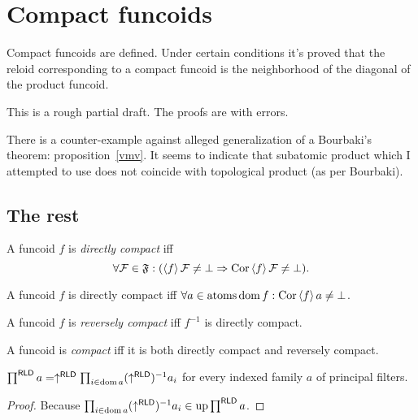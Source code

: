 \chapter{Compact funcoids}

Compact funcoids are defined. Under certain conditions it's proved that the
reloid corresponding to a compact funcoid is the neighborhood of the diagonal
of the product funcoid.

This is a rough partial draft. The proofs are with errors.

There is a counter-example against alleged generalization of a Bourbaki's theorem:
proposition~\ref{vmv}. It seems to indicate that subatomic product which I attempted to use
does not coincide with topological product (as per Bourbaki).

\section{The rest}

\begin{defn}
  A funcoid $f$ is \emph{directly compact} iff
  \[ \text{$\forall \mathcal{F} \in \mathfrak{F}: (\left\langle f\right\rangle
     \mathcal{F} \neq \bot \Rightarrow \operatorname{Cor} \left\langle f\right\rangle \mathcal{F}
     \neq \bot)$.} \]
\end{defn}

\begin{obvious}
A funcoid $f$ is directly compact iff $\forall a \in \operatorname{atoms} \operatorname{dom} f :
\operatorname{Cor} \left\langle f\right\rangle a \neq \bot$.
\end{obvious}

\begin{defn}
  A funcoid $f$ is \emph{reversely compact} iff $f^{- 1}$ is directly
  compact.
\end{defn}

\begin{defn}
  A funcoid is \emph{compact} iff it is both directly compact and reversely
  compact.
\end{defn}

\begin{prop}
  $\prod^{\mathsf{RLD}} a = \uparrow^{\mathsf{RLD}} \prod_{i \in
  \operatorname{dom} a} (\uparrow^{\mathsf{RLD}})^{- 1} a_i$ for every indexed
  family $a$ of principal filters.
\end{prop}

\begin{proof}
Because $\prod_{i \in \operatorname{dom} a} (\uparrow^{\mathsf{RLD}})^{- 1} a_i
\in \operatorname{up} \prod^{\mathsf{RLD}} a$.
\end{proof}

